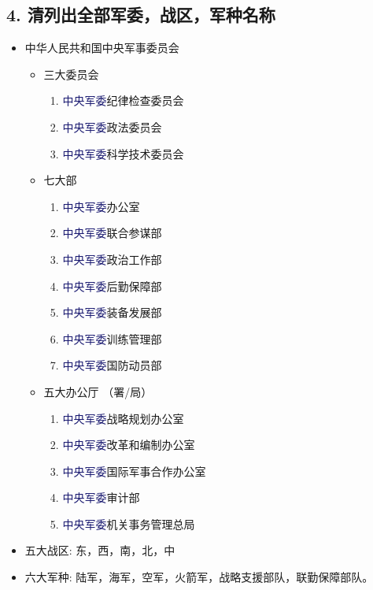 \documentclass[dvipsnames]{ctexart}
\newcommand{\mycola}{MidnightBlue}
\newcommand{\cola}[1]{\textcolor{\mycola}{#1}}
\begin{document}
\subsection*{4. 清列出全部军委，战区，军种名称}
\begin{itemize}
\item 中华人民共和国中央军事委员会
  \begin{itemize}
  \item 三大委员会
    \begin{enumerate}
    \item \cola{中央军委}纪律检查委员会
    \item \cola{中央军委}政法委员会
    \item \cola{中央军委}科学技术委员会
    \end{enumerate}
  \item 七大部
    \begin{enumerate}
    \item \cola{中央军委}办公室
    \item \cola{中央军委}联合参谋部
    \item \cola{中央军委}政治工作部
    \item \cola{中央军委}后勤保障部
    \item \cola{中央军委}装备发展部
    \item \cola{中央军委}训练管理部
    \item \cola{中央军委}国防动员部
    \end{enumerate}
  \item 五大办公厅 （署/局）
    \begin{enumerate}
    \item \cola{中央军委}战略规划办公室
    \item \cola{中央军委}改革和编制办公室
    \item \cola{中央军委}国际军事合作办公室
    \item \cola{中央军委}审计部
    \item \cola{中央军委}机关事务管理总局
    \end{enumerate}
  \end{itemize}
\item 五大战区: 东，西，南，北，中
\item 六大军种: 陆军，海军，空军，火箭军，战略支援部队，联勤保障部队。
\end{itemize}
\end{document}
